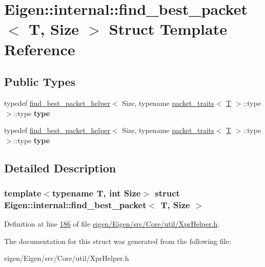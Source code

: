 \hypertarget{struct_eigen_1_1internal_1_1find__best__packet}{}\section{Eigen\+:\+:internal\+:\+:find\+\_\+best\+\_\+packet$<$ T, Size $>$ Struct Template Reference}
\label{struct_eigen_1_1internal_1_1find__best__packet}
\subsection*{Public Types}
\begin{DoxyCompactItemize}
\item 
\mbox{\label{struct_eigen_1_1internal_1_1find__best__packet_a323bedf4d5c5e4a2721d20708827c7ee}} 
typedef \hyperlink{struct_eigen_1_1internal_1_1find__best__packet__helper}{find\+\_\+best\+\_\+packet\+\_\+helper}$<$ Size, typename \hyperlink{struct_eigen_1_1internal_1_1packet__traits}{packet\+\_\+traits}$<$ \hyperlink{group___sparse_core___module}{T} $>$\+::type $>$\+::type {\bfseries type}
\item 
\mbox{\label{struct_eigen_1_1internal_1_1find__best__packet_a323bedf4d5c5e4a2721d20708827c7ee}} 
typedef \hyperlink{struct_eigen_1_1internal_1_1find__best__packet__helper}{find\+\_\+best\+\_\+packet\+\_\+helper}$<$ Size, typename \hyperlink{struct_eigen_1_1internal_1_1packet__traits}{packet\+\_\+traits}$<$ \hyperlink{group___sparse_core___module}{T} $>$\+::type $>$\+::type {\bfseries type}
\end{DoxyCompactItemize}


\subsection{Detailed Description}
\subsubsection*{template$<$typename T, int Size$>$\newline
struct Eigen\+::internal\+::find\+\_\+best\+\_\+packet$<$ T, Size $>$}



Definition at line \hyperlink{eigen_2_eigen_2src_2_core_2util_2_xpr_helper_8h_source_l00186}{186} of file \hyperlink{eigen_2_eigen_2src_2_core_2util_2_xpr_helper_8h_source}{eigen/\+Eigen/src/\+Core/util/\+Xpr\+Helper.\+h}.



The documentation for this struct was generated from the following file\+:\begin{DoxyCompactItemize}
\item 
eigen/\+Eigen/src/\+Core/util/\+Xpr\+Helper.\+h\end{DoxyCompactItemize}
